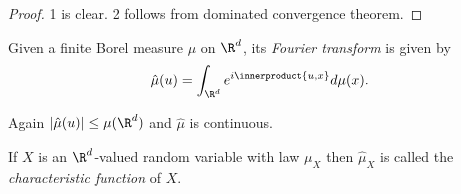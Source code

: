\documentclass[a4paper]{article}
\newcommand*{\ip}{\innerproduct} %
\begin{document}
\begin{proof}
  1 is clear. 2 follows from dominated convergence theorem.
\end{proof}

\begin{definition}
  Given a finite Borel measure \(\mu\) on \(\R^d\), its \emph{Fourier transform} is given by
  \[
    \hat \mu(u) = \int_{\R^d} e^{i \ip{u, x}} d \mu(x).
  \]
\end{definition}

Again \(|\hat \mu(u)| \leq \mu (\R^d)\) and \(\hat \mu\) is continuous.

\begin{remark}
  If \(X\) is an \(\R^d\)-valued random variable with law \(\mu_X\) then \(\hat \mu_X\) is called the \emph{characteristic function} of \(X\).
\end{remark}
\end{document}

